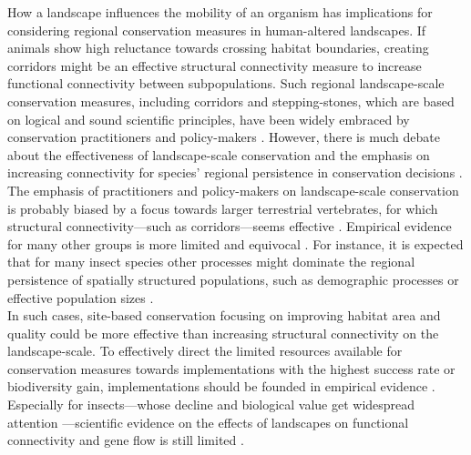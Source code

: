 \documentclass[10pt, twoside]{book} %
\begin{document}
	How a landscape influences the mobility of an organism has implications for considering regional conservation measures in human-altered landscapes. If animals show high reluctance towards crossing habitat boundaries, creating corridors might be an effective structural connectivity measure to increase functional connectivity between subpopulations. Such regional landscape-scale conservation measures, including corridors and stepping-stones, which are based on logical and sound scientific principles, have been widely embraced by conservation practitioners and policy-makers \citep{crooks2006, watts2016}. However, there is much debate about the effectiveness of landscape-scale conservation and the emphasis on increasing connectivity for species' regional persistence in conservation decisions \citep{hodgson2009, humphrey2015, watts2016}. The emphasis of practitioners and policy-makers on landscape-scale conservation is probably biased by a focus towards larger terrestrial vertebrates, for which structural connectivity---such as corridors---seems effective \citep{humphrey2015}. Empirical evidence for many other groups is more limited and equivocal \citep{ovaskainen2008, watts2016}. For instance, it is expected that for many insect species other processes might dominate the regional persistence of spatially structured populations, such as demographic processes or effective population sizes \citep{richardson2016, drake2022}.\\
	
	In such cases, site-based conservation focusing on improving habitat area and quality could be more effective than increasing structural connectivity on the landscape-scale. To effectively direct the limited resources available for conservation measures towards implementations with the highest success rate or biodiversity gain, implementations should be founded in empirical evidence \citep{sutherland2004, ferraro2006, samways2020}. Especially for insects---whose decline and biological value get widespread attention \citep{didham2020, wagner2021}---scientific evidence on the effects of landscapes on functional connectivity and gene flow is still limited \citep{keyghobadi1999, wilcock2007, keller2012, perez-espona2012, watts2016, haran2017, trense2021}.\\
	
\end{document}
